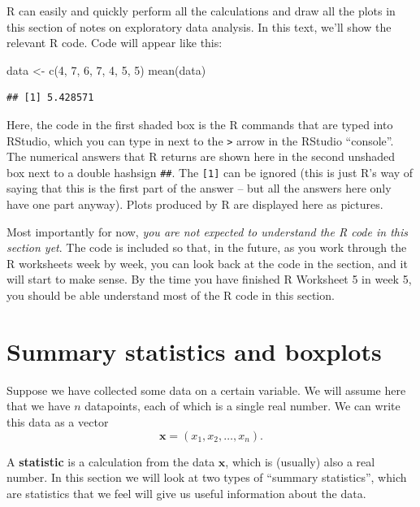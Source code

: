 \documentclass[
  a4paper,
]{book}
\newenvironment{Shaded}{\begin{snugshade}}{\end{snugshade}}
\newcommand{\DecValTok}[1]{\textcolor[rgb]{0.00,0.00,0.81}{#1}}
\newcommand{\FunctionTok}[1]{\textcolor[rgb]{0.00,0.00,0.00}{#1}}
\newcommand{\NormalTok}[1]{#1}
\newcommand{\OtherTok}[1]{\textcolor[rgb]{0.56,0.35,0.01}{#1}}
\theoremstyle{definition}
\theoremstyle{definition}
\theoremstyle{definition}
\theoremstyle{definition}
\theoremstyle{remark}
\begin{document}
R can easily and quickly perform all the calculations and draw all the plots in this section of notes on exploratory data analysis. In this text, we'll show the relevant R code. Code will appear like this:

\begin{Shaded}
\begin{Highlighting}[]
\NormalTok{data }\OtherTok{\textless{}{-}} \FunctionTok{c}\NormalTok{(}\DecValTok{4}\NormalTok{, }\DecValTok{7}\NormalTok{, }\DecValTok{6}\NormalTok{, }\DecValTok{7}\NormalTok{, }\DecValTok{4}\NormalTok{, }\DecValTok{5}\NormalTok{, }\DecValTok{5}\NormalTok{)}
\FunctionTok{mean}\NormalTok{(data)}
\end{Highlighting}
\end{Shaded}

\begin{verbatim}
## [1] 5.428571
\end{verbatim}

Here, the code in the first shaded box is the R commands that are typed into
RStudio, which you can type in next to the \texttt{\textgreater{}} arrow in the RStudio ``console''. The numerical answers that R returns are shown here in the second unshaded box next to a double hashsign \texttt{\#\#}. The \texttt{{[}1{]}} can be ignored (this is just R's way of saying that this is the first part of the answer -- but all the answers here only have one part anyway). Plots produced by R are displayed here as pictures.

Most importantly for now, \emph{you are not expected to understand the R code in this section yet}. The code is included so that, in the future, as you work through the R worksheets week by week, you can look back at the code in the section, and it will start to make sense. By the time you have finished R Worksheet 5 in week 5, you should be able understand most of the R code in this section.

\hypertarget{summary-stat}{%
\section{Summary statistics and boxplots}\label{summary-stat}}

Suppose we have collected some data on a certain variable. We will assume here that we have \(n\) datapoints, each of which is a single real number. We can write this data as a vector
\[ \mathbf x = (x_1, x_2, \dots, x_n) . \]

A \textbf{statistic} is a calculation from the data \(\mathbf x\), which is (usually) also a real number. In this section we will look at two types of ``summary statistics'', which are statistics that we feel will give us useful information about the data.
\end{document}
